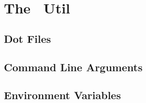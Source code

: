 

\section{The \ExBib\ Util}

\INCOMPLETE

\subsection{Dot Files}


\INCOMPLETE


\subsection{Command Line Arguments}


\INCOMPLETE


\subsection{Environment Variables}


\INCOMPLETE



\endinput
%
